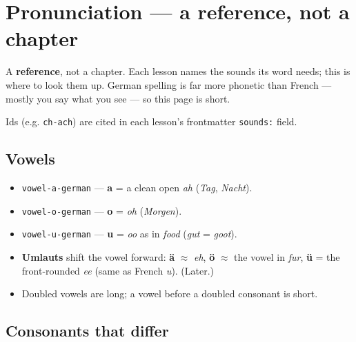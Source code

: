 
\chapter*{Pronunciation --- a reference, not a chapter}

A \textbf{reference}, not a chapter. Each lesson names the sounds its word needs; this is where to look them up. German spelling is far more phonetic than French — mostly you say what you see — so this page is short.

Ids (e.g. \texttt{ch-ach}) are cited in each lesson's frontmatter \texttt{sounds:} field.

\section*{Vowels}

\begin{itemize}
\raggedright
\setlength{\itemsep}{0.35em}
  \item \texttt{vowel-a-german} — \textbf{a} = a clean open \emph{ah} (\emph{Tag}, \emph{Nacht}).
  \item \texttt{vowel-o-german} — \textbf{o} = \emph{oh} (\emph{Morgen}).
  \item \texttt{vowel-u-german} — \textbf{u} = \emph{oo} as in \emph{food} (\emph{gut} = \emph{goot}).
  \item \textbf{Umlauts} shift the vowel forward: \textbf{ä} $\approx$ \emph{eh}, \textbf{ö} $\approx$ the vowel in \emph{fur}, \textbf{ü} = the front-rounded \emph{ee} (same as French \emph{u}). (Later.)
  \item Doubled vowels are long; a vowel before a doubled consonant is short.
\end{itemize}

\section*{Consonants that differ}

